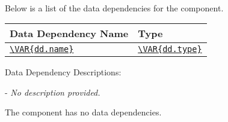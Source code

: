  \\
\par Below is a list of the data dependencies for the  component.

\begin{xltabular}{\textwidth}{ | l | X | }
  \hline
  \textbf{Data Dependency Name} & \textbf{Type} \\ \hline
  \texttt{\url{\VAR{dd.name}}} &
  \texttt{\url{\VAR{dd.type}}}
  \\ \hline
\end{xltabular}
\vspace{5mm} %

Data Dependency Descriptions:
\begin{spaceditemize}
  \item \textbf{\texttt{}} - 
    \textit{No description provided.}
\end{spaceditemize}
\vspace{5mm} %
\par The  component has no data dependencies.

